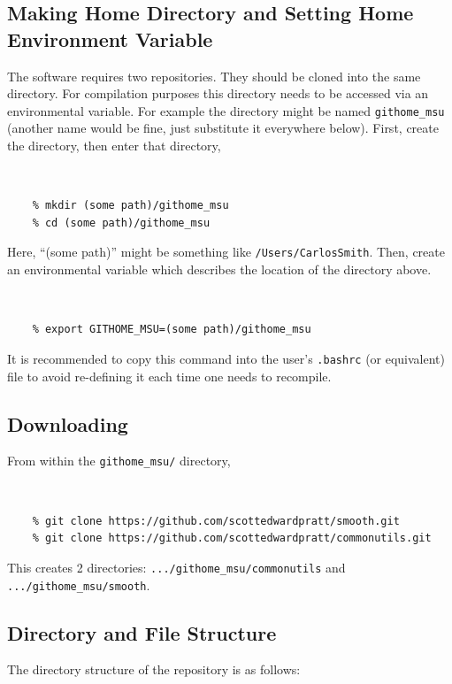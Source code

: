 \documentclass[12pt]{article}
\numberwithin{equation}{section}
\numberwithin{figure}{section}
\begin{document}
\subsection{Making Home Directory and Setting Home Environment Variable}

The software requires two repositories. They should be cloned into the same directory. For compilation purposes this directory needs to be accessed via an environmental variable.  For example the directory might be named {\tt githome\_msu} (another name would be fine, just substitute it everywhere below). First, create the directory, then enter that directory,\\
\vspace{-20pt}
{\tt 
\begin{verbatim}
    % mkdir (some path)/githome_msu
    % cd (some path)/githome_msu
\end{verbatim}
}
Here, ``(some path)'' might be something like {\tt /Users/CarlosSmith}. Then, create an environmental variable which describes the location of the directory above.\\
\vspace{-20pt}
{\tt 
\begin{verbatim}
    % export GITHOME_MSU=(some path)/githome_msu
\end{verbatim}
}
It is recommended to copy this command into the user's {\tt .bashrc} (or equivalent) file to avoid re-defining it each time one needs to recompile.

\subsection{Downloading}\label{sec:Downloading_Compiling}
From within the {\tt githome\_msu/} directory,\\
\vspace{-20pt}
{\tt 
\begin{verbatim}
    % git clone https://github.com/scottedwardpratt/smooth.git
    % git clone https://github.com/scottedwardpratt/commonutils.git
\end{verbatim}
}

This creates 2 directories: {\tt .../githome\_msu/commonutils} and {\tt .../githome\_msu/smooth}.

\subsection{Directory and File Structure}

The directory structure of the repository is as follows: 
\end{document}
